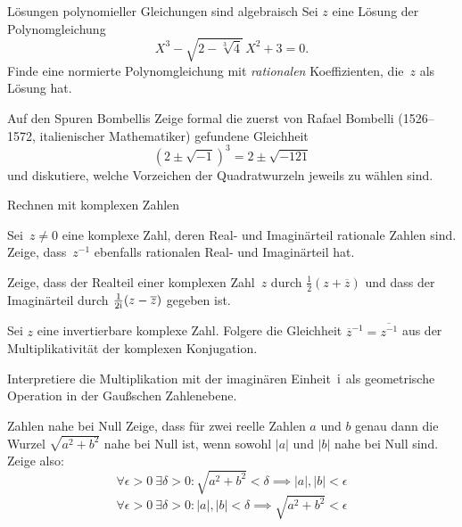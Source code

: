 \documentclass{algblatt}
\begin{document}

\begin{aufgabe}{Lösungen polynomieller Gleichungen sind algebraisch}
Sei $z$ eine Lösung der Polynomgleichung
\[ X^3 - \sqrt{2 - \sqrt[3] 4} \, X^2 + 3 = 0. \]
Finde eine normierte Polynomgleichung mit \emph{rationalen} Koeffizienten,
die~$z$ als Lösung hat.
\end{aufgabe}

\begin{aufgabe}{Auf den Spuren Bombellis}
Zeige formal die zuerst von Rafael Bombelli (1526--1572, italienischer
Mathematiker) gefundene
Gleichheit
\[
    (2 \pm \sqrt{-1})^3 = 2 \pm \sqrt{- 121}
\]
und diskutiere, welche Vorzeichen der Quadratwurzeln jeweils zu wählen sind.
\end{aufgabe}

\begin{aufgabeE}{Rechnen mit komplexen Zahlen}
\item
Sei~$z \neq 0$ eine komplexe Zahl, deren Real- und Imaginärteil rationale
Zahlen sind. Zeige, dass~$z^{-1}$ ebenfalls rationalen Real- und Imaginärteil
hat.
\item
Zeige, dass der Realteil einer komplexen Zahl~$z$ durch
\(\frac 1 2 (z + \overline z)\)
und dass der Imaginärteil durch \(\frac 1 {2 \mathrm{i}} (z - \overline z)\)
gegeben ist.
\item
Sei \(z\) eine invertierbare komplexe Zahl. Folgere die Gleichheit
$
    \overline{z}^{-1} = \overline{z^{-1}}
$
aus der Multiplikativität der komplexen Konjugation.
\item
Interpretiere die Multiplikation mit der imaginären Einheit~$\mathrm{i}$
als geometrische Operation in der Gaußschen Zahlenebene.
\end{aufgabeE}

\begin{aufgabe}{Zahlen nahe bei Null}
Zeige, dass für zwei reelle Zahlen $a$ und $b$ genau dann die Wurzel
$\sqrt{a^2 + b^2}$ nahe bei Null ist, wenn sowohl $|a|$ und $|b|$
nahe bei Null sind. Zeige also:
\[    \forall \epsilon > 0\ \exists \delta > 0  \colon 
        \sqrt{a^2 + b^2} < \delta  \implies |a|, |b| < \epsilon
\]
\[
    \forall \epsilon > 0\ \exists \delta > 0  \colon 
        |a|, |b| < \delta  \implies \sqrt{a^2  + b^2} < \epsilon
\]
\vspace{-1em}
\end{aufgabe}
\end{document}
